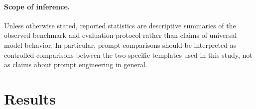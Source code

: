 \documentclass[11pt]{article}
\begin{document}
\paragraph{Scope of inference.}
Unless otherwise stated, reported statistics are descriptive summaries of the observed benchmark and evaluation protocol rather than claims of universal model behavior. In particular, prompt comparisons should be interpreted as controlled comparisons between the two specific templates used in this study, not as claims about prompt engineering in general.

\section{Results}

\begin{table}[t]
\centering
\small
\caption{Main results across all 13 models and two prompt configurations (100 problems, $R=5$ runs, 13{,}000 total evaluation instances). RLPR, PSR, and AV are shown for both \textsc{Detailed} (D) and \textsc{Minimal} (M) prompts. All values are point estimates in \%; corresponding 95\% confidence intervals are computed as described in Section~3 and reported in the archived per-model summaries.}
\label{tab:overall-performance}
\setlength{\tabcolsep}{2.5pt}
\end{table}
\end{document}
